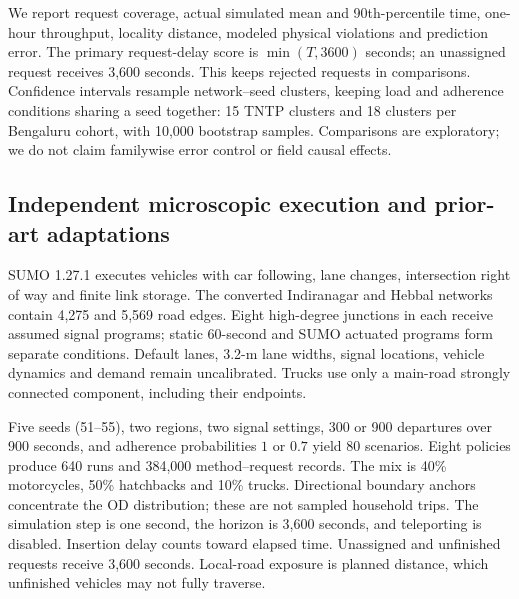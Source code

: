 \documentclass[sigconf,anonymous,review]{acmart}
\begin{document}
We report request coverage, actual simulated mean and 90th-percentile time, one-hour throughput, locality distance, modeled physical violations and prediction error. The primary request-delay score is $\min(T,3600)$ seconds; an unassigned request receives 3,600 seconds. This keeps rejected requests in comparisons. Confidence intervals resample network--seed clusters, keeping load and adherence conditions sharing a seed together: 15 TNTP clusters and 18 clusters per Bengaluru cohort, with 10,000 bootstrap samples. Comparisons are exploratory; we do not claim familywise error control or field causal effects.

\subsection{Independent microscopic execution and prior-art adaptations}
SUMO 1.27.1\cite{sumo2018} executes vehicles with car following, lane changes, intersection right of way and finite link storage. The converted Indiranagar and Hebbal networks contain 4,275 and 5,569 road edges. Eight high-degree junctions in each receive assumed signal programs; static 60-second and SUMO actuated programs form separate conditions. Default lanes, 3.2-m lane widths, signal locations, vehicle dynamics and demand remain uncalibrated. Trucks use only a main-road strongly connected component, including their endpoints.

Five seeds (51--55), two regions, two signal settings, 300 or 900 departures over 900 seconds, and adherence probabilities $1$ or $0.7$ yield 80 scenarios. Eight policies produce 640 runs and 384,000 method--request records. The mix is 40\% motorcycles, 50\% hatchbacks and 10\% trucks. Directional boundary anchors concentrate the OD distribution; these are not sampled household trips. The simulation step is one second, the horizon is 3,600 seconds, and teleporting is disabled. Insertion delay counts toward elapsed time. Unassigned and unfinished requests receive 3,600 seconds. Local-road exposure is planned distance, which unfinished vehicles may not fully traverse.
\end{document}
